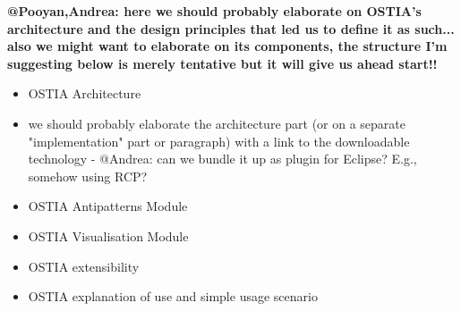 \textbf{@Pooyan,Andrea: here we should probably elaborate on OSTIA's architecture and the design principles that led us to define it as such... also we might want to elaborate on its components, the structure I'm suggesting below is merely tentative but it will give us ahead start!!}

\begin{itemize}
\item OSTIA Architecture 
\item we should probably elaborate the architecture part (or on a separate "implementation" part or paragraph) with a link to the downloadable technology - @Andrea: can we bundle it up as plugin for Eclipse? E.g., somehow using RCP?
\item OSTIA Antipatterns Module
\item OSTIA Visualisation Module 
\item OSTIA extensibility
\item OSTIA explanation of use and simple usage scenario
\end{itemize}
